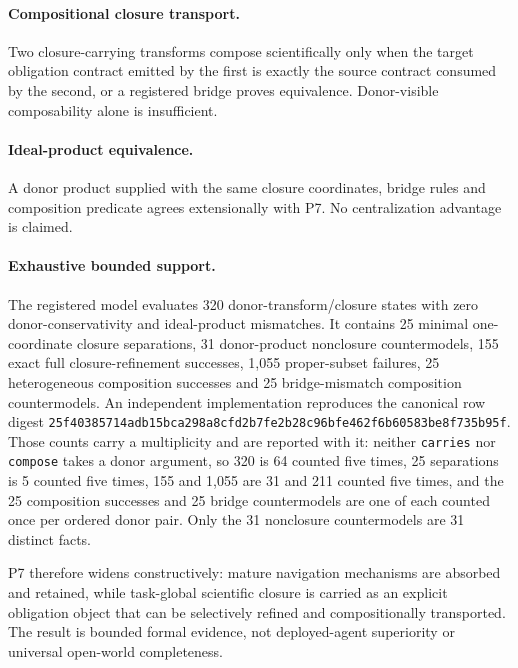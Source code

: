 \paragraph{Compositional closure transport.}
Two closure-carrying transforms compose scientifically only when the target obligation contract emitted by the first is exactly the source contract consumed by the second, or a registered bridge proves equivalence. Donor-visible composability alone is insufficient.

\paragraph{Ideal-product equivalence.}
A donor product supplied with the same closure coordinates, bridge rules and composition predicate agrees extensionally with P7. No centralization advantage is claimed.

\paragraph{Exhaustive bounded support.}
The registered model evaluates 320 donor-transform/closure states with zero donor-conservativity and ideal-product mismatches. It contains 25 minimal one-coordinate closure separations, 31 donor-product nonclosure countermodels, 155 exact full closure-refinement successes, 1,055 proper-subset failures, 25 heterogeneous composition successes and 25 bridge-mismatch composition countermodels. An independent implementation reproduces the canonical row digest \texttt{25f40385714adb15bca298a8cfd2b7fe2b28c96bfe462f6b60583be8f735b95f}. Those counts carry a multiplicity and are reported with it: neither \texttt{carries} nor \texttt{compose} takes a donor argument, so 320 is 64 counted five times, 25 separations is 5 counted five times, 155 and 1,055 are 31 and 211 counted five times, and the 25 composition successes and 25 bridge countermodels are one of each counted once per ordered donor pair. Only the 31 nonclosure countermodels are 31 distinct facts.

P7 therefore widens constructively: mature navigation mechanisms are absorbed and retained, while task-global scientific closure is carried as an explicit obligation object that can be selectively refined and compositionally transported. The result is bounded formal evidence, not deployed-agent superiority or universal open-world completeness.
